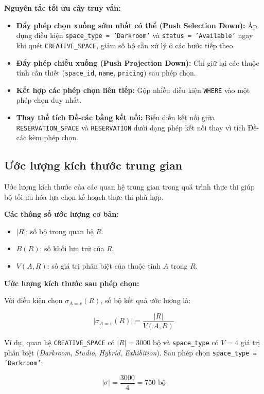 \textbf{Nguyên tắc tối ưu cây truy vấn:}

\begin{itemize}
    \item \textbf{Đẩy phép chọn xuống sớm nhất có thể (Push Selection Down):} Áp dụng điều kiện \texttt{space\_type = 'Darkroom'} và \texttt{status = 'Available'} ngay khi quét \texttt{CREATIVE\_SPACE}, giảm số bộ cần xử lý ở các bước tiếp theo.
    \item \textbf{Đẩy phép chiếu xuống (Push Projection Down):} Chỉ giữ lại các thuộc tính cần thiết (\texttt{space\_id}, \texttt{name}, \texttt{pricing}) sau phép chọn.
    \item \textbf{Kết hợp các phép chọn liên tiếp:} Gộp nhiều điều kiện \texttt{WHERE} vào một phép chọn duy nhất.
    \item \textbf{Thay thế tích Đề-các bằng kết nối:} Biểu diễn kết nối giữa \texttt{RESERVATION\_SPACE} và \texttt{RESERVATION} dưới dạng phép kết nối thay vì tích Đề-các kèm phép chọn.
\end{itemize}

\subsection{Ước lượng kích thước trung gian}

Ước lượng kích thước của các quan hệ trung gian trong quá trình thực thi giúp bộ tối ưu hóa lựa chọn kế hoạch thực thi phù hợp.

\textbf{Các thông số ước lượng cơ bản:}

\begin{itemize}
    \item $|R|$: số bộ trong quan hệ $R$.
    \item $B(R)$: số khối lưu trữ của $R$.
    \item $V(A, R)$: số giá trị phân biệt của thuộc tính $A$ trong $R$.
\end{itemize}

\textbf{Ước lượng kích thước sau phép chọn:}

Với điều kiện chọn $\sigma_{A = v}(R)$, số bộ kết quả ước lượng là:

$$|\sigma_{A=v}(R)| = \frac{|R|}{V(A, R)}$$

Ví dụ, quan hệ \texttt{CREATIVE\_SPACE} có $|R| = 3000$ bộ và \texttt{space\_type} có $V = 4$ giá trị phân biệt (\textit{Darkroom}, \textit{Studio}, \textit{Hybrid}, \textit{Exhibition}). Sau phép chọn \texttt{space\_type = 'Darkroom'}:

$$|\sigma| = \frac{3000}{4} = 750 \text{ bộ}$$

